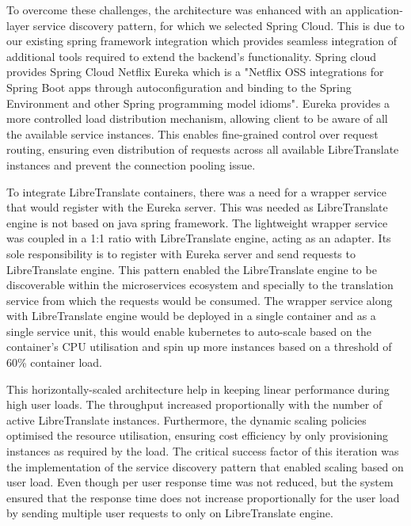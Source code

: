 To overcome these challenges, the architecture was enhanced with an application-layer service discovery pattern, for which we selected Spring Cloud. This is due to our existing spring framework integration which provides seamless integration of additional tools required to extend the backend's functionality. Spring cloud provides Spring Cloud Netflix Eureka which is a "Netflix OSS integrations for Spring Boot apps through autoconfiguration and binding to the Spring Environment and other Spring programming model idioms"\cite{spring_cloud_netflix}\cite{carnell2021spring}\cite{netflix_eureka}. Eureka provides a more controlled load distribution mechanism, allowing client to be aware of all the available service instances. This enables fine-grained control over request routing, ensuring even distribution of requests across all available LibreTranslate instances and prevent the connection pooling issue.

To integrate LibreTranslate containers, there was a need for a wrapper service that would register with the Eureka server. This was needed as LibreTranslate engine is not based on java spring framework. The lightweight wrapper service was coupled in a 1:1 ratio with LibreTranslate engine, acting as an adapter. Its sole responsibility is to register with Eureka server and send requests to LibreTranslate engine. This pattern enabled the LibreTranslate engine to be discoverable within the microservices ecosystem and specially to the translation service from which the requests would be consumed. The wrapper service along with LibreTranslate engine would be deployed in a single container and as a single service unit, this would enable kubernetes to auto-scale based on the container's CPU utilisation and spin up more instances based on a threshold of 60\% container load.

This horizontally-scaled architecture help in keeping linear performance during high user loads. The throughput increased proportionally with the number of active LibreTranslate instances. Furthermore, the dynamic scaling policies optimised the resource utilisation, ensuring cost efficiency by only provisioning instances as required by the load. The critical success factor of this iteration was the implementation of the service discovery pattern that enabled scaling based on user load. Even though per user response time was not reduced, but the system ensured that the response time does not increase proportionally for the user load by sending multiple user requests to only on LibreTranslate engine.


